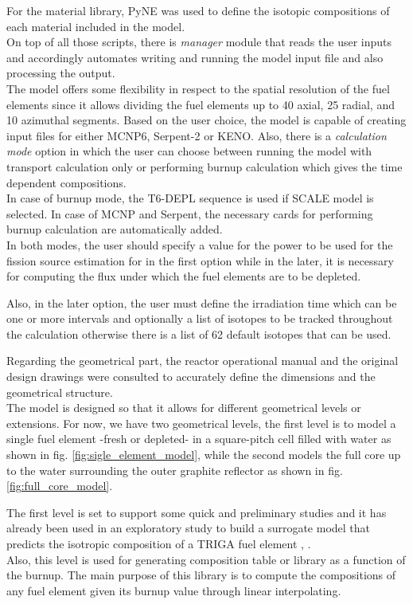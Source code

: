 \documentclass[review]{elsarticle}
\begin{document}
 For the material library, PyNE \cite{bates2014pyne} was used to define the isotopic compositions of each material included in the model.\\
 On top of all those scripts, there is \emph{manager} module that reads the user inputs and accordingly automates writing and running the model input file and also processing the output.\\
 The model offers some flexibility in respect to the spatial resolution of the fuel elements since it allows dividing the fuel elements up to 40 axial, 25 radial, and 10 azimuthal segments.
 Based on the user choice, the model is capable of creating input files for either MCNP6, Serpent-2 or KENO. Also, there is a \emph{calculation mode} option in which the user can choose between running the model with transport calculation only or performing burnup calculation which gives the time dependent compositions.\\
 In case of burnup mode, the T6-DEPL sequence is used if SCALE model is selected. In case of MCNP and Serpent, the necessary cards for performing burnup calculation are automatically added. \\
 In both modes, the user should specify a value for the power to be used for the fission source estimation for in the first option while in the later, it is necessary for computing the flux under which the fuel elements are to be depleted.
 
 Also, in the later option, the user must define the irradiation time which can be one or more intervals and optionally a list of isotopes to be tracked throughout the calculation otherwise there is a list of 62 default isotopes that can be used.
 
 Regarding the geometrical part, the reactor operational manual and the original design drawings were consulted to accurately define the dimensions and the geometrical structure.\\  The model is designed so that it allows for different geometrical levels or extensions. For now, we have two geometrical levels, the first level is to model a single fuel element -fresh or depleted- in a square-pitch cell filled with water as shown in fig. \ref{fig:sigle_element_model}, while the second models the full core up to the water surrounding the outer graphite reflector as shown in fig.\ref{fig:full_core_model}.
 
 The first level is set to support some quick and preliminary studies and it has already been used in an exploratory study to build a surrogate model that predicts the isotropic composition of a TRIGA fuel element \cite{abdo2018dds}, \cite{elzohery2018cbg}.\\
 Also, this level is used for generating composition table or library as a function of the burnup. The main purpose of this library is to compute the compositions of any fuel element  given its burnup value through linear interpolating.
\end{document}
